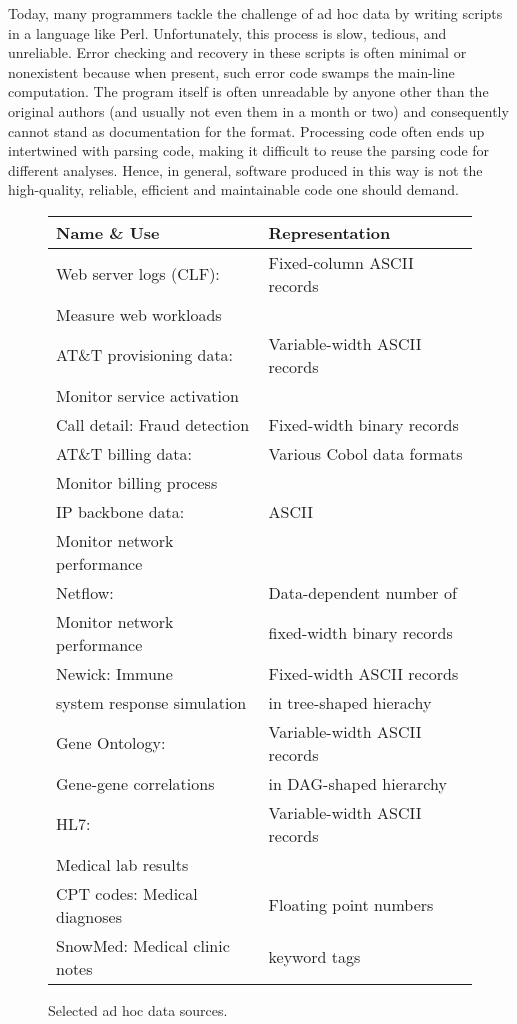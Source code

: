 Today, many programmers tackle the challenge of ad hoc data by writing
scripts in a language like Perl.  Unfortunately, this process is slow,
tedious, and unreliable.  Error checking and recovery in these scripts
is often minimal or nonexistent because when present, such error code
swamps the main-line computation.  The program itself is often
unreadable by anyone other than the original authors (and usually not
even them in a month or two) and consequently cannot stand as
documentation for the format.  Processing code often ends up
intertwined with parsing code, making it difficult to reuse the
parsing code for different analyses. Hence, in general, software
produced in this way is not the high-quality, reliable, efficient and
maintainable code one should demand.

\begin{figure}
\begin{center}
\begin{tabular}{|l|l|}
\hline
Name \& Use   &  Representation               \\ \hline\hline
Web server logs (CLF):  &  Fixed-column ASCII records \\ 
Measure web workloads &                             \\ \hline
AT\&T provisioning data: & Variable-width ASCII records  \\ 
Monitor service activation &                              \\ \hline
Call detail: Fraud detection  &  Fixed-width binary records \\  \hline 
AT\&T billing data: & Various Cobol data formats  \\ 
Monitor billing process   &                             \\ \hline
IP backbone data:  & ASCII   \\
Monitor network performance  &        \\ \hline
Netflow:                        & Data-dependent number of     \\ 
Monitor network performance  & fixed-width binary records  \\ \hline
Newick:   Immune                 & Fixed-width ASCII records \\ 
system response simulation & in tree-shaped hierachy\\ \hline                                
Gene Ontology:             & Variable-width ASCII records \\
Gene-gene correlations     & in DAG-shaped hierarchy \\ \hline
HL7:             & Variable-width ASCII records \\
Medical lab results     &  \\ \hline
CPT codes: Medical diagnoses & Floating point numbers \\ \hline
SnowMed: Medical clinic notes & keyword tags  \\ \hline


\end{tabular}


\caption{Selected ad hoc data sources.}
\label{figure:data-sources}
\end{center}
\end{figure}
 
